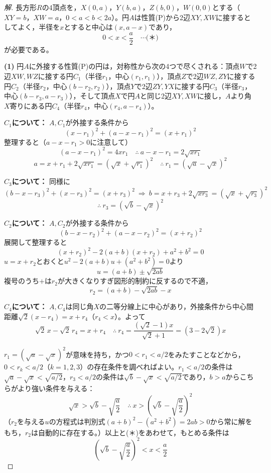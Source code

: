 \documentclass[../main.tex]{subfiles}
\begin{document}
\begin{proof}[解]
  長方形$R$の4頂点を，$X(0,a)$，$Y(b,a)$，$Z(b,0)$，$W(0,0)$とする（$XY=b$，$XW=a$，$0<a<b<2a$）。円$A$は性質(P)から2辺$XY,XW$に接するとしてよく，半径を$x$とすると中心は$(x,a-x)$であり，
  \[
    0<x<\frac a2 \quad\cdots\text{(＊)}
  \]
  が必要である。

  \textbf{(1)} 円$A$に外接する性質(P)の円は，対称性から次の4つで尽くされる：頂点$W$で2辺$XW,WZ$に接する円$C_1$（半径$r_1$，中心$(r_1,r_1)$），頂点$Z$で2辺$WZ,ZY$に接する円$C_2$（半径$r_2$，中心$(b-r_2,r_2)$），頂点$Y$で2辺$ZY,YX$に接する円$C_3$（半径$r_3$，中心$(b-r_3,a-r_3)$），そして頂点$X$で円$A$と同じ2辺$XY,XW$に接し，$A$より角$X$寄りにある円$C_4$（半径$r_4$，中心$(r_4,a-r_4)$）。

  \textbf{$C_1$について：} $A,C_1$が外接する条件から
  \[
    (x-r_1)^2+(a-x-r_1)^2=(x+r_1)^2
  \]
  整理すると（$a-x-r_1>0$に注意して）
  \[
    (a-x-r_1)^2=4xr_1 \quad\therefore\ a-x-r_1=2\sqrt{xr_1}
  \]
  \[
    a=x+r_1+2\sqrt{xr_1}=(\sqrt x+\sqrt{r_1})^2 \quad\therefore\ r_1=(\sqrt a-\sqrt x)^2
  \]

  \textbf{$C_3$について：} 同様に
  \[
    (b-x-r_3)^2+(x-r_3)^2=(x+r_3)^2 \ \Longrightarrow\ b=x+r_3+2\sqrt{xr_3}=(\sqrt x+\sqrt{r_3})^2
  \]
  \[
    \therefore\ r_3=(\sqrt b-\sqrt x)^2
  \]

  \textbf{$C_2$について：} $A,C_2$が外接する条件から
  \[
    (b-x-r_2)^2+(a-x-r_2)^2=(x+r_2)^2
  \]
  展開して整理すると
  \[
    (x+r_2)^2-2(a+b)(x+r_2)+a^2+b^2=0
  \]
  $u=x+r_2$とおくと$u^2-2(a+b)u+(a^2+b^2)=0$より
  \[
    u=(a+b)\pm\sqrt{2ab}
  \]
  複号のうち$+$は$r_2$が大きくなりすぎ図形的制約に反するので不適，
  \[
    r_2=(a+b)-\sqrt{2ab}-x
  \]

  \textbf{$C_4$について：} $A,C_4$は同じ角$X$の二等分線上に中心があり，外接条件から中心間距離$\sqrt2(x-r_4)=x+r_4$（$r_4<x$）。よって
  \[
    \sqrt2\,x-\sqrt2\,r_4=x+r_4 \quad\therefore\ r_4=\frac{(\sqrt2-1)x}{\sqrt2+1}=(3-2\sqrt2)x
  \]

  $r_1=(\sqrt a-\sqrt x)^2$が意味を持ち，かつ$0<r_1<a/2$をみたすことなどから，$0<r_k<a/2$（$k=1,2,3$）の存在条件を調べればよい。$r_1<a/2$の条件は$\sqrt a-\sqrt x<\sqrt{a/2}$，$r_3<a/2$の条件は$\sqrt b-\sqrt x<\sqrt{a/2}$であり，$b>a$からこちらがより強い条件を与える：
  \[
    \sqrt x>\sqrt b-\sqrt{\frac a2} \quad\therefore\ x>\left(\sqrt b-\sqrt{\frac a2}\right)^2
  \]
  （$r_2$を与える$u$の方程式は判別式$(a+b)^2-(a^2+b^2)=2ab>0$から常に解をもち，$r_2$は自動的に存在する。）以上と(＊)をあわせて，もとめる条件は
  \[
    \left(\sqrt b-\sqrt{\frac a2}\right)^2<x<\frac a2
  \]


\end{proof}
\end{document}
